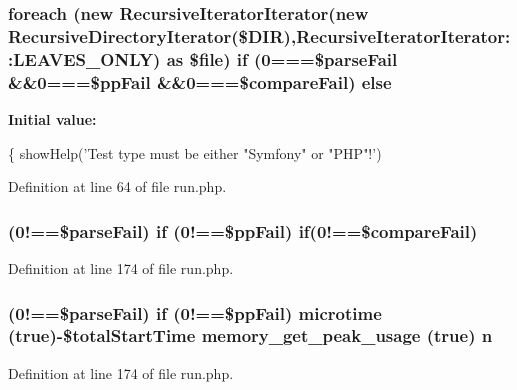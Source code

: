 \subsubsection[{else}]{\setlength{\rightskip}{0pt plus 5cm}foreach (new Recursive\+Iterator\+Iterator(new Recursive\+Directory\+Iterator(\$D\+I\+R),Recursive\+Iterator\+Iterator\+::\+L\+E\+A\+V\+E\+S\+\_\+\+O\+N\+L\+Y) as \$file) {\bf if} (0===\$parse\+Fail \&\&0===\$pp\+Fail \&\&0===\$compare\+Fail) else}\label{run_8php_a551d754ca139f0e7496355d9368f7b36}
{\bfseries Initial value\+:}
\begin{DoxyCode}
\{
    showHelp(\textcolor{stringliteral}{'Test type must be either "Symfony" or "PHP"!'})
\end{DoxyCode}


Definition at line 64 of file run.\+php.

\subsubsection[{if}]{ (0!==\$parse\+Fail) {\bf if} (0!==\$pp\+Fail) {\bf if}(0!==\$compare\+Fail)}\label{run_8php_add95dc511716c00fc95313296c87d6e8}


Definition at line 174 of file run.\+php.

\subsubsection[{n}]{ (0!==\$parse\+Fail) {\bf if} (0!==\$pp\+Fail) microtime (true)-\/\$total\+Start\+Time memory\+\_\+get\+\_\+peak\+\_\+usage (true) n}\label{run_8php_af1e5a7b3d99676df85ceeb07c3486ea0}


Definition at line 174 of file run.\+php.

